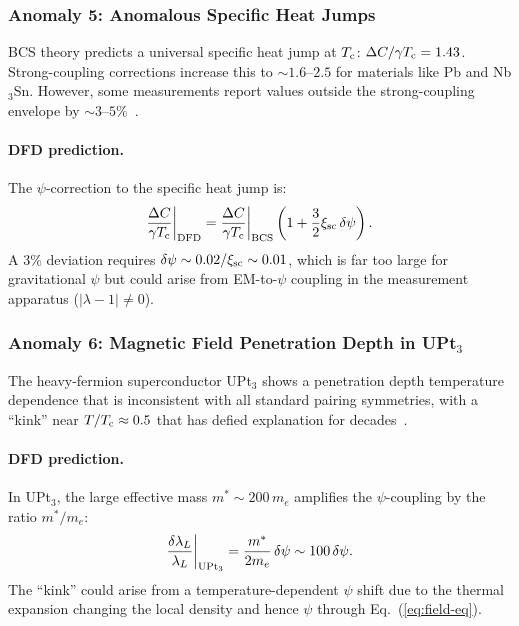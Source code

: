 \documentclass[aps,prb,twocolumn,superscriptaddress,floatfix,nofootinbib,longbibliography]{revtex4-2}
\newcommand{\Tc}{T_{\rm c}}
\begin{document}
\subsubsection{Anomaly 5: Anomalous Specific Heat Jumps}

BCS theory predicts a universal specific heat jump at $\Tc$:
$\Delta C/\gamma\Tc = 1.43$.  Strong-coupling corrections increase this
to $\sim 1.6$--$2.5$ for materials like Pb and Nb$_3$Sn.  However,
some measurements report values outside the strong-coupling envelope by
$\sim 3$--$5\%$~\cite{Padamsee1973,Carbotte1990}.

\paragraph{DFD prediction.}
The $\psi$-correction to the specific heat jump is:
\begin{equation}
\frac{\Delta C}{\gamma\Tc}\bigg|_{\rm DFD}
= \frac{\Delta C}{\gamma\Tc}\bigg|_{\rm BCS}
\left(1 + \frac{3}{2}\xi_{\rm sc}\,\delta\psi\right).
\label{eq:specific-heat}
\end{equation}
A $3\%$ deviation requires $\delta\psi \sim 0.02/\xi_{\rm sc} \sim 0.01$,
which is far too large for gravitational $\psi$ but could arise from
EM-to-$\psi$ coupling in the measurement apparatus
($|\lambda - 1| \neq 0$).

\subsubsection{Anomaly 6: Magnetic Field Penetration Depth in UPt$_3$}

The heavy-fermion superconductor UPt$_3$ shows a penetration depth
temperature dependence that is inconsistent with all standard pairing
symmetries, with a ``kink'' near $T/\Tc \approx 0.5$ that has defied
explanation for decades~\cite{Signore1995,Strand2010}.

\paragraph{DFD prediction.}
In UPt$_3$, the large effective mass $m^* \sim 200\,m_e$ amplifies the
$\psi$-coupling by the ratio $m^*/m_e$:
\begin{equation}
\frac{\delta\lambda_L}{\lambda_L}\bigg|_{\rm UPt_3}
= \frac{m^*}{2m_e}\,\delta\psi \sim 100\,\delta\psi.
\label{eq:upt3}
\end{equation}
The ``kink'' could arise from a temperature-dependent $\psi$ shift due
to the thermal expansion changing the local density and hence $\psi$
through Eq.~(\ref{eq:field-eq}).
\end{document}
